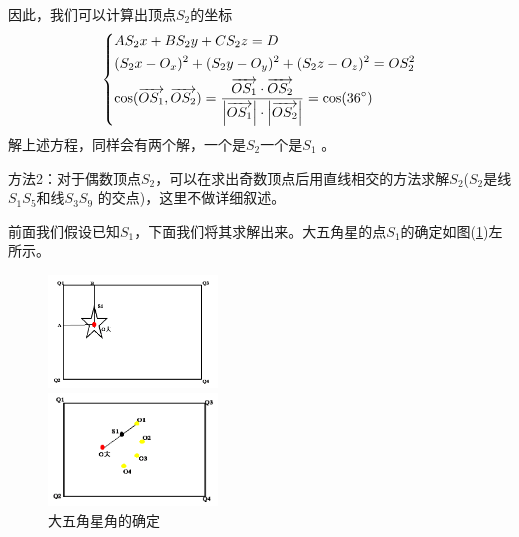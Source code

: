             因此，我们可以计算出顶点$S_2$的坐标
            \begin{equation*}
            \centering
            \left\{\begin{lgathered}
            AS_2x+BS_2y+CS_2z=D\\
            (S_2x-O_x)^2+(S_2y-O_y)^2+(S_2z-O_z)^2=OS_2^2\\
            \cos(\overrightarrow{OS_1},\overrightarrow{OS_2})=\frac{\overrightarrow{OS_1}\cdot\overrightarrow{OS_2}}{\left|\overrightarrow{OS_1}\right|\cdot\left|\overrightarrow{OS_2}\right|}=\cos(36^\circ)
             \end{lgathered} \right.
            \end{equation*}
            解上述方程，同样会有两个解，一个是$S_2$一个是$S_1$ 。
            \par
            方法2：对于偶数顶点$S_2$，可以在求出奇数顶点后用直线相交的方法求解$S_2$($S_2$是线$S_1S_5$和线$S_3S_9$ 的交点)，这里不做详细叙述。
            \par
            前面我们假设已知$S_1$，下面我们将其求解出来。大五角星的点$S_1$的确定如图(\ref{fig:大五角星角的确定})左所示。
            \begin{figure}[H]
              \centering
              \begin{varwidth}[t]{\textwidth}
                \vspace{0pt}
                \includegraphics[height=3cm]{images/17.jpg}
              \end{varwidth}
              \qquad
              \begin{varwidth}[t]{\textwidth}
                \vspace{0pt}
                \includegraphics[height=3cm]{images/18.jpg}
              \end{varwidth}
            \caption{大五角星角的确定}
            \label{fig:大五角星角的确定}
            \end{figure}
